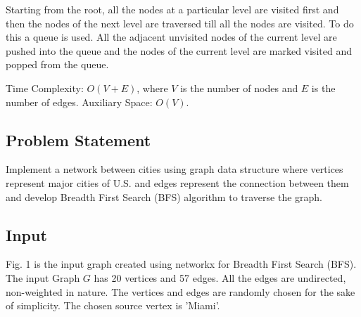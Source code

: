 \documentclass[lettersize,journal]{IEEEtran}
\begin{document}
Starting from the root, all the nodes at a particular level are visited first and then the nodes of the next level are traversed till all the nodes are visited. To do this a queue is used. All the adjacent unvisited nodes of the current level are pushed into the queue and the nodes of the current level are marked visited and popped from the queue.

Time Complexity: \(O(V+E)\), where \(V\) is the number of nodes and \(E\) is the number of edges.
Auxiliary Space: \(O(V)\).


\subsection{Problem Statement}
Implement a network between cities using graph data structure where vertices represent major cities of U.S. and edges represent the connection between them and develop Breadth First Search (BFS) algorithm to traverse the graph.

\subsection{Input}
Fig. 1 is the input graph created using networkx for Breadth First Search (BFS). The input Graph \(G\) has 20 vertices and 57 edges. All the edges are undirected, non-weighted in nature. The vertices and edges are randomly chosen for the sake of simplicity. The chosen source vertex is 'Miami'.

\end{document}
